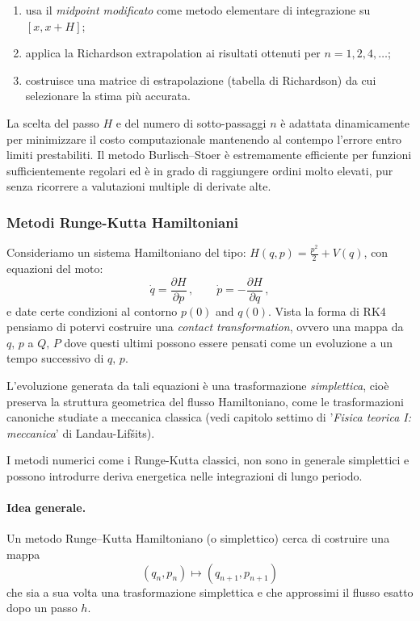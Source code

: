 \begin{enumerate}
	\item usa il \emph{midpoint modificato} come metodo elementare di integrazione
	su $[x, x+H]$;
	\item applica la Richardson extrapolation ai risultati ottenuti per
	$n = 1,2,4,\dots$;
	\item costruisce una matrice di estrapolazione (tabella di Richardson)
	da cui selezionare la stima più accurata.
\end{enumerate}

La scelta del passo $H$ e del numero di sotto-passaggi $n$ è adattata dinamicamente
per minimizzare il costo computazionale mantenendo al contempo l'errore entro
limiti prestabiliti.  
Il metodo Burlisch--Stoer è estremamente efficiente per funzioni sufficientemente
regolari ed è in grado di raggiungere ordini molto elevati, pur senza ricorrere
a valutazioni multiple di derivate alte.


%
%
\vspace{1cm}
\subsubsection{Metodi Runge-Kutta Hamiltoniani}

Consideriamo un sistema Hamiltoniano del tipo: $\boxed{H(q,p) = \displaystyle\frac{p^2}{2} + V(q)}$, con equazioni del moto:
\[
\dot{q} = \frac{\partial H}{\partial p}\, , \qquad
\dot{p} = -\frac{\partial H}{\partial q}\, ,
\]
e date certe condizioni al contorno $p(0)$ and $q(0)$. Vista la forma di RK4 pensiamo di potervi costruire una \emph{contact transformation}, ovvero una mappa da $q,\, p$ a $Q,\, P$ dove questi ultimi possono essere pensati come un evoluzione a un tempo successivo di $q,\, p$.


L'evoluzione generata da tali equazioni è una trasformazione \emph{simplettica},
cioè preserva la struttura geometrica del flusso Hamiltoniano, come le trasformazioni canoniche studiate a meccanica classica (vedi capitolo settimo di '\emph{Fisica teorica I: meccanica}' di Landau-Lif\v{s}its). 

I metodi numerici come i Runge-Kutta classici, non sono in generale
simplettici e possono introdurre deriva energetica nelle integrazioni di lungo periodo.

\paragraph{Idea generale.}
Un metodo Runge--Kutta Hamiltoniano (o simplettico) cerca di costruire una mappa
\[
(q_n,p_n) \longmapsto (q_{n+1},p_{n+1})
\]
che sia a sua volta una trasformazione simplettica e che approssimi il flusso
esatto dopo un passo $h$.

